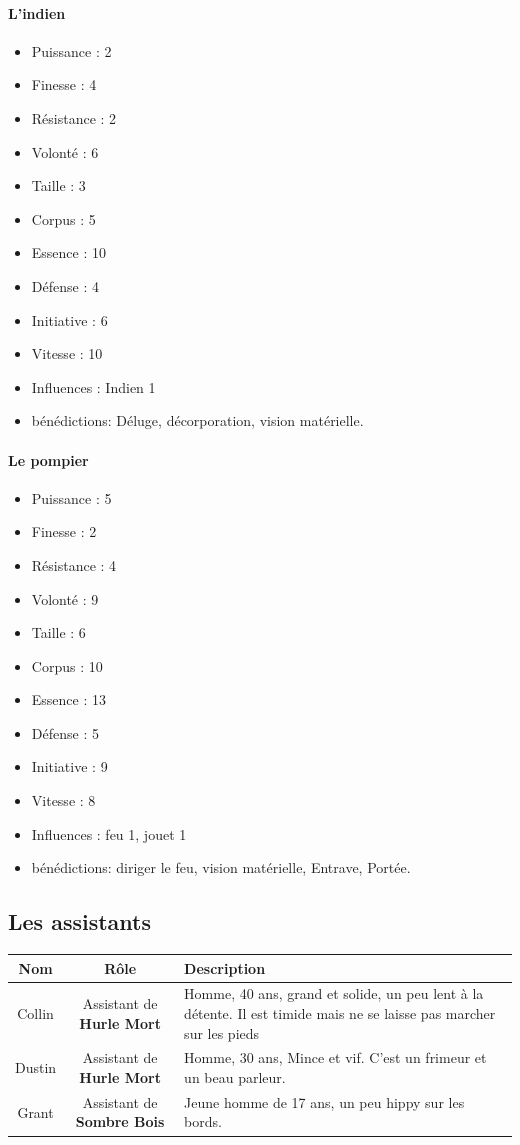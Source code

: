 \documentclass[oneside,12pt]{book}
\newcommand{\Peter}{\textbf{Hurle Mort} }
\newcommand{\Leonard}{\textbf{Sombre Bois} }
\begin{document}
\begin{flushleft}
\paragraph{L'indien}
\begin{itemize}
\item Puissance : 2
\item Finesse : 4
\item Résistance : 2
\item Volonté : 6
\item Taille : 3
\item Corpus : 5
\item Essence : 10
\item Défense : 4
\item Initiative : 6
\item Vitesse : 10
\item Influences : Indien 1
\item bénédictions: Déluge, décorporation, vision matérielle.
\end{itemize}


\paragraph{Le pompier}
\begin{itemize}
\item Puissance : 5
\item Finesse : 2
\item Résistance : 4
\item Volonté : 9
\item Taille : 6
\item Corpus : 10
\item Essence : 13
\item Défense : 5
\item Initiative : 9
\item Vitesse : 8
\item Influences : feu 1, jouet 1
\item bénédictions: diriger le feu, vision matérielle, Entrave, Portée.
\end{itemize}

\subsection{Les assistants}
\begin{tabularx}{\linewidth}{|c|c|X|}
\hline
Nom & Rôle & Description \\
\hline
Collin & Assistant de \Peter & Homme, 40 ans, grand et solide, un peu lent à la détente. Il est timide mais ne se laisse pas marcher sur les pieds\\
\hline
Dustin & Assistant de \Peter & Homme, 30 ans, Mince et vif. C'est un frimeur et un beau parleur.\\
\hline
Grant & Assistant de \Leonard & Jeune homme de 17 ans, un peu hippy sur les bords.  \\
\hline
\end{tabularx}


\end{flushleft}
\end{document}

